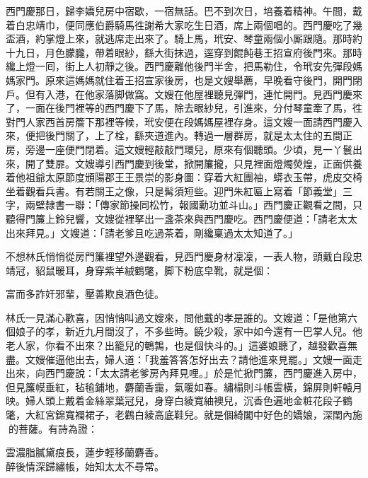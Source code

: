 西門慶那日，歸李嬌兒房中宿歇，一宿無話。巴不到次日，培養着精神。{}午間，戴着白忠靖巾，便同應伯爵騎馬徃謝希大家吃生日酒，席上兩個唱的。西門慶吃了幾盃酒，約掌燈上來，就逃席走出來了。騎上馬，玳安、琴童兩個小厮跟隨。那時約十九日，月色朦朧，帶着眼紗，繇大街抹過，逕穿到餛飩巷王招宣府後門來。那時纔上燈一囘，街上人初靜之後。西門慶離他後門半舍，把馬勒住，令玳安先彈段媽媽家門。原來這媽媽就住着王招宣家後房，也是文嫂舉薦，早晚看守後門，開門閉戶。但有入港，在他家落脚做窩。文嫂在他屋裡聽見彈門，連忙開門。見西門慶來了，一面在後門裡等的西門慶下了馬，除去眼紗兒，引進來，分付琴童牽了馬，徃對門人家西首房簷下那裡等候，玳安便在段媽媽屋裡存身。這文嫂一面請西門慶入來，便把後門關了，上了栓，繇夾道進內。轉過一層群房，就是太太住的五間正房，旁邊一座便門閉着。這文嫂輕敲敲門環兒，原來有個聽頭。少頃，見一丫鬟出來，開了雙扉。文嫂導引西門慶到後堂，掀開簾攏，只見裡面燈燭熒煌，正面供養着他祖爺太原節度頒陽郡王王景崇的影身圖：穿着大紅團袖，蟒衣玉帶，虎皮交椅坐着觀看兵書。有若關王之像，{}只是髯須短些。迎門朱紅匾上寫着「節義堂」三字，兩壁隸書一聯：「傳家節操同松竹，{}報國勳功並斗山。」西門慶正觀看之間，只聽得門簾上鈴兒響，文嫂從裡拏出一盞茶來與西門慶吃。西門慶便道：「請老太太出來拜見。」文嫂道：「請老爹且吃過茶着，剛纔稟過太太知道了。」

不想林氏悄悄從房門簾裡望外邊觀看，見西門慶身材凜凜，一表人物，頭戴白段忠靖冠，貂鼠暖耳，身穿紫羊絨鶴氅，脚下粉底皁靴，就是個：

\begin{myquote} 
富而多詐奸邪輩，壓善欺良酒色徒。
\end{myquote} 

林氏一見滿心歡喜，因悄悄叫過文嫂來，問他戴的孝是誰的。文嫂道：「是他第六個娘子的孝，新近九月間沒了，不多些時。饒少殺，家中如今還有一巴掌人兒。他老人家，你看不出來？出籠兒的鵪鶉，也是個快斗的。」{}這婆娘聽了，越發歡喜無盡。文嫂催逼他出去，婦人道：「我羞答答怎好出去？請他進來見罷。」{}文嫂一面走出來，向西門慶說：「太太請老爹房內拜見哩。」於是忙掀門簾，西門慶進入房中，但見簾幙垂紅，毡毺鋪地，麝蘭香靄，氣暖如春。繡榻則斗帳雲橫，錦屏則軒轅月映。婦人頭上戴着金絲翠葉冠兒，身穿白綾寬紬襖兒，沉香色遍地金粧花段子鶴氅，大紅宮錦寬襴裙子，老鸛白綾高底鞋兒。就是個綺閣中好色的嬌娘，深閨內施𣭈的菩薩。有詩為證：

\begin{myquote} 
雲濃脂膩黛痕長，蓮步輕移蘭麝香。\\
醉後情深歸繡帳，始知太太不尋常。{}
\end{myquote} 


